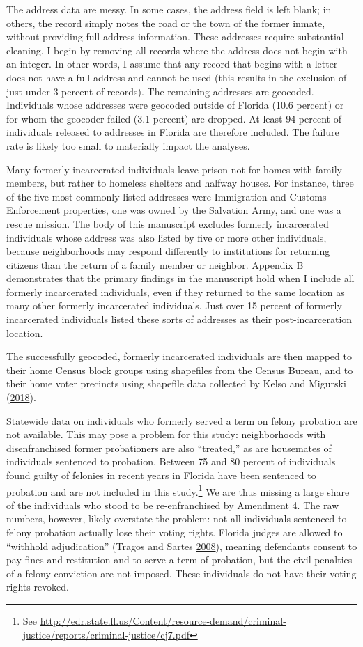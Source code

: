 \documentclass[
  12pt,
]{article}
\begin{document}
The address data are messy. In some cases, the address field is left blank; in others, the record simply notes the road or the town of the former inmate, without providing full address information. These addresses require substantial cleaning. I begin by removing all records where the address does not begin with an integer. In other words, I assume that any record that begins with a letter does not have a full address and cannot be used (this results in the exclusion of just under 3 percent of records). The remaining addresses are geocoded. Individuals whose addresses were geocoded outside of Florida (10.6 percent) or for whom the geocoder failed (3.1 percent) are dropped. At least 94 percent of individuals released to addresses in Florida are therefore included. The failure rate is likely too small to materially impact the analyses.

Many formerly incarcerated individuals leave prison not for homes with family members, but rather to homeless shelters and halfway houses. For instance, three of the five most commonly listed addresses were Immigration and Customs Enforcement properties, one was owned by the Salvation Army, and one was a rescue mission. The body of this manuscript excludes formerly incarcerated individuals whose address was also listed by five or more other individuals, because neighborhoods may respond differently to institutions for returning citizens than the return of a family member or neighbor. Appendix B demonstrates that the primary findings in the manuscript hold when I include all formerly incarcerated individuals, even if they returned to the same location as many other formerly incarcerated individuals. Just over 15 percent of formerly incarcerated individuals listed these sorts of addresses as their post-incarceration location.

The successfully geocoded, formerly incarcerated individuals are then mapped to their home Census block groups using shapefiles from the Census Bureau, and to their home voter precincts using shapefile data collected by Kelso and Migurski (\protect\hyperlink{ref-Kelso2018}{2018}).

Statewide data on individuals who formerly served a term on felony probation are not available. This may pose a problem for this study: neighborhoods with disenfranchised former probationers are also ``treated,'' as are housemates of individuals sentenced to probation. Between 75 and 80 percent of individuals found guilty of felonies in recent years in Florida have been sentenced to probation and are not included in this study.\footnote{See \url{http://edr.state.fl.us/Content/resource-demand/criminal-justice/reports/criminal-justice/cj7.pdf}} We are thus missing a large share of the individuals who stood to be re-enfranchised by Amendment 4. The raw numbers, however, likely overstate the problem: not all individuals sentenced to felony probation actually lose their voting rights. Florida judges are allowed to ``withhold adjudication'' (Tragos and Sartes \protect\hyperlink{ref-Tragos2008}{2008}), meaning defendants consent to pay fines and restitution and to serve a term of probation, but the civil penalties of a felony conviction are not imposed. These individuals do not have their voting rights revoked.
\end{document}
